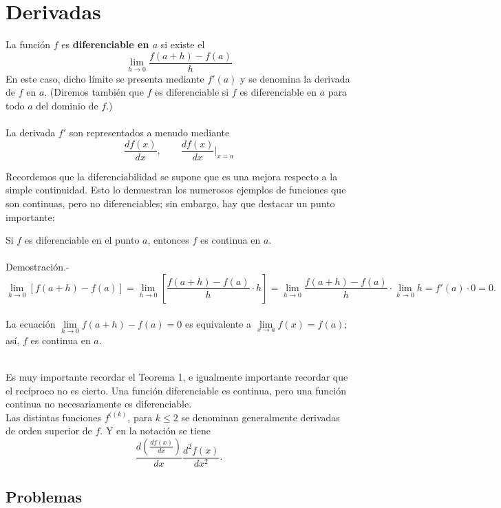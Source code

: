 \chapter{Derivadas}

    \begin{def.}
    La función $f$ es \textbf{\boldmath diferenciable en $a$} si existe el  
    $$\lim_{h\to 0}\dfrac{f(a+h)-f(a)}{h}$$
    En este caso, dicho límite se presenta mediante $f'(a)$ y se denomina la derivada de $f$ en $a$. (Diremos también que $f$ es diferenciable si $f$ es diferenciable en $a$ para todo $a$ del dominio de $f.$)\\\\
    La derivada $f'$ son representados a menudo mediante
    $$\dfrac{df(x)}{dx}, \qquad \dfrac{df(x)}{dx}\bigg|_{x=a}$$
    \end{def.}

Recordemos que la diferenciabilidad se supone que es una mejora respecto a la simple continuidad. Esto lo demuestran los numerosos ejemplos de funciones que son continuas, pero no diferenciables; sin embargo, hay que destacar un punto importante:\\

\begin{teo}
    Si $f$ es diferenciable en el punto $a$, entonces $f$ es continua en $a$.\\\\
	Demostración.-\;
	$$\lim_{h\to 0} \left[f(a+h)-f(a)\right] = \lim_{h\to 0} \left[\dfrac{f(a+h)-f(a)}{h}\cdot h\right] = \lim_{h\to 0} \dfrac{f(a+h)-f(a)}{h}\cdot \lim_{h\to 0} h = f'(a)\cdot 0 = 0.$$\\
	La ecuación $\lim\limits_{h\to 0}f(a+h)-f(a)=0$ es equivalente a $\lim\limits_{x\to a} f(x)=f(a);$ así, $f$ es continua en $a$.\\\\
\end{teo}

Es muy importante recordar el Teorema 1, e igualmente importante recordar que el recíproco no es cierto. Una función diferenciable es continua, pero una función continua no necesariamente es diferenciable.\\

Las distintas funciones $f^{((k)}$, para $k\leq 2$ se denominan generalmente derivadas de orden superior de $f$. Y en la notación se tiene $$\dfrac{d\left(\frac{df(x)}{dx}\right)}{dx}\dfrac{d^2f(x)}{dx^2}.$$

\section{Problemas}

